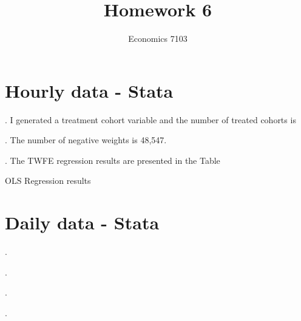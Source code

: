 \documentclass{article}
\title{Homework 6}
\author{Economics 7103}
\begin{document}
  
\maketitle

\section{Hourly data - Stata}
. I generated a treatment cohort variable and the number of treated cohorts is 

. The number of negative weights is  48,547.

. The TWFE regression results are presented in the Table 

\begin{table}[h]
    \centering
    
    \caption{OLS Regression results}
    \label{tab:OLS1}
\end{table}

\section{Daily data - Stata}

. 

.

. 

.
\end{document}
